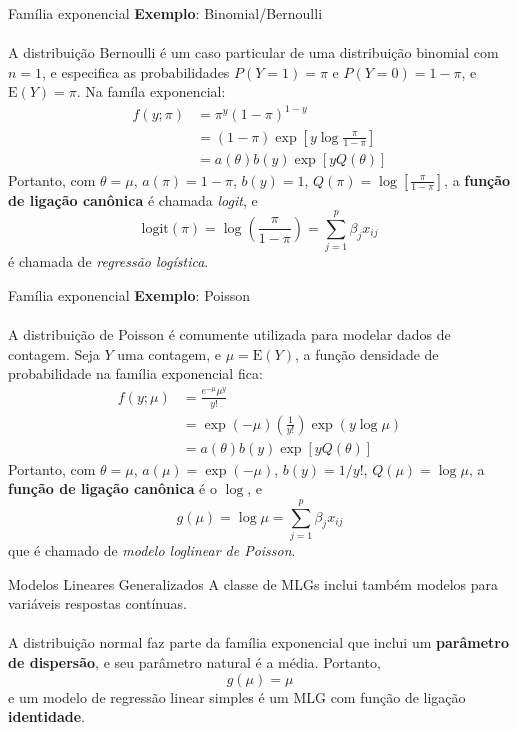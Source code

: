\documentclass[10pt]{beamer}\usepackage[]{graphicx}\usepackage[]{color}
\providecommand{\E}{\text{E}}
\theoremstyle{definition}
\begin{document}
\begin{frame}[fragile]{Família exponencial}
  \textbf{Exemplo}: Binomial/Bernoulli \\~\\
  A distribuição Bernoulli é um caso particular de uma distribuição
  binomial com $n=1$, e especifica as probabilidades $P(Y=1) = \pi$ e
  $P(Y=0) = 1-\pi$, e $\E(Y) = \pi$. Na famíla exponencial:
  \begin{align*}
    f(y;\pi) &= \pi^y (1-\pi)^{1-y} \\
             &= (1-\pi) \exp{\left[ y \log\frac{\pi}{1-\pi} \right]} \\
             &= a(\theta)b(y) \exp{[y Q(\theta)]}
  \end{align*}
  Portanto, com $\theta = \mu$, $a(\pi) = 1-\pi$, $b(y) = 1$, $Q(\pi) =
  \log[\frac{\pi}{1-\pi}]$, a \textbf{função de ligação canônica} é
  chamada \textit{logit}, e
  \begin{equation*}
    \text{logit}(\pi) = \log\left( \frac{\pi}{1-\pi}  \right) =
    \sum_{j=1}^{p} \beta_j x_{ij}
  \end{equation*}
  é chamada de \textit{regressão logística}.
\end{frame}

\begin{frame}[fragile]{Família exponencial}
  \textbf{Exemplo}: Poisson \\~\\
  A distribuição de Poisson é comumente utilizada para modelar dados de
  contagem. Seja $Y$ uma contagem, e $\mu = \E(Y)$, a função densidade
  de probabilidade na família exponencial fica:
  \begin{align*}
    f(y;\mu) &= \frac{e^{-\mu} \mu^y}{y!} \\
             &= \exp{(-\mu)} \left( \frac{1}{y!} \right) \exp{(y \log
               \mu)} \\
             &= a(\theta)b(y) \exp{[y Q(\theta)]}
  \end{align*}
  Portanto, com $\theta = \mu$, $a(\mu) = \exp{(-\mu)}$, $b(y) = 1/y!$,
  $Q(\mu) = \log \mu$, a \textbf{função de ligação canônica} é o $\log$,
  e
  \begin{equation*}
    g(\mu) = \log \mu = \sum_{j=1}^{p} \beta_j x_{ij}
  \end{equation*}
  que é chamado de \textit{modelo loglinear de Poisson}.
\end{frame}

\begin{frame}[fragile]{Modelos Lineares Generalizados}
  A classe de MLGs inclui também modelos para variáveis respostas
  contínuas. \\~\\
  A distribuição normal faz parte da família exponencial que inclui um
  \textbf{parâmetro de dispersão}, e seu parâmetro natural é a média.
  Portanto,
  \begin{equation*}
    g(\mu) = \mu
  \end{equation*}
  e um modelo de regressão linear simples é um MLG com função de ligação
  \textbf{identidade}.
\end{frame}
\end{document}
